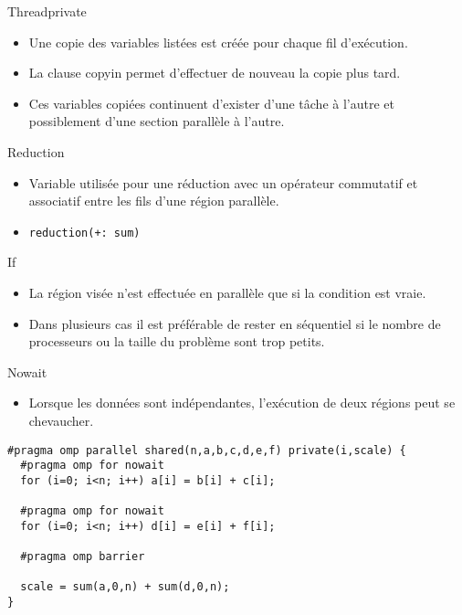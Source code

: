 \documentclass[10pt]{beamer}
\begin{document}
\begin{frame}{Threadprivate}

  \begin{itemize}
    \item Une copie des variables listées est créée pour chaque fil d'exécution.

    \item La clause copyin permet d'effectuer de nouveau la copie plus tard.

    \item Ces variables copiées continuent d'exister d'une tâche à l'autre et possiblement d'une section parallèle à l'autre.
  \end{itemize}
\end{frame}

\begin{frame}[fragile]{Reduction}

  \begin{itemize}
    \item Variable utilisée pour une réduction avec un opérateur commutatif et associatif entre les fils d'une région parallèle.

    \item \texttt{reduction(+: sum)}
  \end{itemize}
\end{frame}

\begin{frame}{If}

  \begin{itemize}
    \item La région visée n'est effectuée en parallèle que si la condition est vraie.

    \item Dans plusieurs cas il est préférable de rester en séquentiel si le nombre de processeurs ou la taille du problème sont trop petits.
  \end{itemize}
\end{frame}

\begin{frame}[fragile]{Nowait}

  \begin{itemize}
    \item Lorsque les données sont indépendantes, l'exécution de deux régions peut se chevaucher.
  \end{itemize}
  \small
  \begin{verbatim}
#pragma omp parallel shared(n,a,b,c,d,e,f) private(i,scale) { 
  #pragma omp for nowait
  for (i=0; i<n; i++) a[i] = b[i] + c[i];

  #pragma omp for nowait
  for (i=0; i<n; i++) d[i] = e[i] + f[i];

  #pragma omp barrier

  scale = sum(a,0,n) + sum(d,0,n);
}
  \end{verbatim}
\end{frame}
\end{document}

